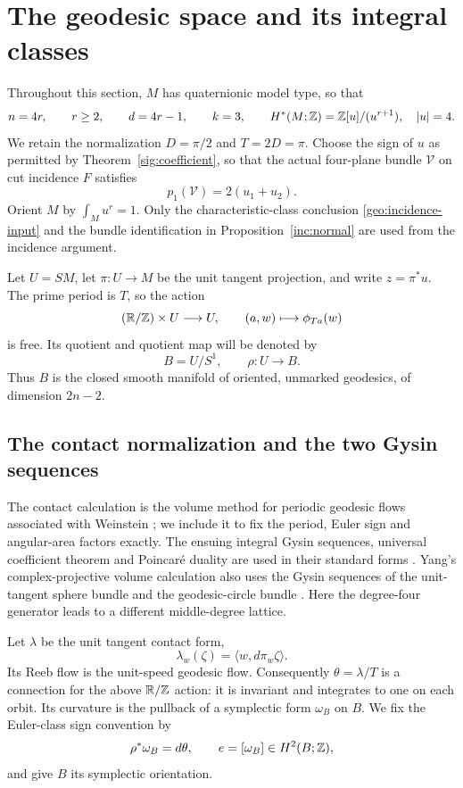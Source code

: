 \section{The geodesic space and its integral classes}
\label{geo:section}

Throughout this section, $M$ has quaternionic model type, so that
\[
 n=4r,\qquad r\ge2,\qquad d=4r-1,\qquad k=3,
 \qquad H^*(M;\mathbb Z)=\mathbb Z[u]/(u^{r+1}),\quad |u|=4.
\]
We retain the normalization $D=\pi/2$ and $T=2D=\pi$.
Choose the sign of $u$ as permitted by Theorem~\ref{sig:coefficient},
so that the actual four-plane bundle $\mathcal V$ on cut incidence
$F$ satisfies
\begin{equation}\label{geo:incidence-input}
 p_1(\mathcal V)=2(u_1+u_2).
\end{equation}
Orient $M$ by $\int_Mu^r=1$.
Only the characteristic-class conclusion
\eqref{geo:incidence-input} and the bundle identification in
Proposition~\ref{inc:normal} are used from the incidence argument.

Let $U=SM$, let $\pi:U\to M$ be the unit tangent projection, and
write $z=\pi^*u$.  The prime period is $T$, so the action
\[
 (\mathbb R/\mathbb Z)\times U\longrightarrow U,
 \qquad (a,w)\longmapsto\phi_{Ta}(w)
\]
is free.  Its quotient and quotient map will be denoted by
\[
 B=U/S^1,\qquad \rho:U\longrightarrow B.
\]
Thus $B$ is the closed smooth manifold of oriented, unmarked
geodesics, of dimension $2n-2$.

\subsection{The contact normalization and the two Gysin sequences}

The contact calculation is the volume method for periodic geodesic
flows associated with Weinstein \citep{Weinstein1974}; we include
it to fix the period, Euler sign and angular-area factors exactly.
The ensuing integral Gysin sequences, universal coefficient theorem
and Poincar\'e duality are used in their standard forms
\citep{Hatcher2002,MilnorStasheff1974}.
Yang's complex-projective volume calculation also uses the Gysin
sequences of the unit-tangent sphere bundle and the geodesic-circle
bundle \citep[pp.~381--382]{Yang1991}.  Here the degree-four
generator leads to a different middle-degree lattice.

Let $\lambda$ be the unit tangent contact form,
\[
 \lambda_w(\zeta)=\langle w,d\pi_w\zeta\rangle.
\]
Its Reeb flow is the unit-speed geodesic flow.  Consequently
$\theta=\lambda/T$ is a connection for the above $\mathbb R/\mathbb Z$ action:
it is invariant and integrates to one on each orbit.  Its curvature
is the pullback of a symplectic form $\omega_B$ on $B$.
We fix the Euler-class sign convention by
\[
 \rho^*\omega_B=d\theta,\qquad e=[\omega_B]\in H^2(B;\mathbb Z),
\]
and give $B$ its symplectic orientation.

